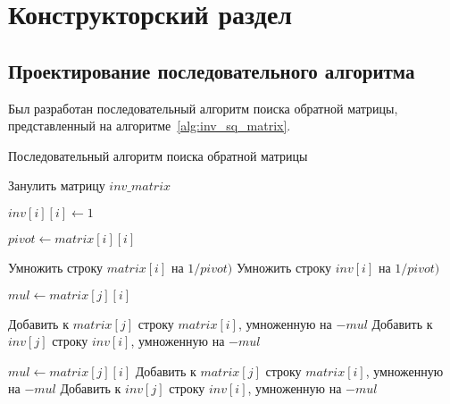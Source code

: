 \chapter{Конструкторский раздел}
\label{ch:design}


\section{Проектирование последовательного алгоритма}

Был разработан последовательный алгоритм поиска обратной матрицы, представленный на алгоритме~\ref{alg:inv_sq_matrix}.

\begin{small}
    \begin{algorithm}[H]
        \caption{Последовательный алгоритм поиска обратной матрицы}
        \label{alg:inv_sq_matrix}
        \begin{algorithmic}[1]
                \State Занулить матрицу $inv\_matrix$

                    \State $inv[i][i] \gets 1$
                \EndFor

                    \State $pivot \gets matrix[i][i]$

                    \State Умножить строку $matrix[i]$ на $1/pivot)$
                    \State Умножить строку $inv[i]$ на $1/pivot)$

                        \State $mul \gets matrix[j][i]$

                        \State Добавить к $matrix[j]$ строку $matrix[i]$, умноженную на $-mul$
                        \State Добавить к $inv[j]$ строку $inv[i]$, умноженную на $-mul$
                    \EndFor
                \EndFor

                        \State $mul \gets matrix[j][i]$
                        \State Добавить к $matrix[j]$ строку $matrix[i]$, умноженную на $-mul$
                        \State Добавить к $inv[j]$ строку $inv[i]$, умноженную на $-mul$
                    \EndFor
                \EndFor
            \EndProcedure
        \end{algorithmic}
    \end{algorithm}
\end{small}


